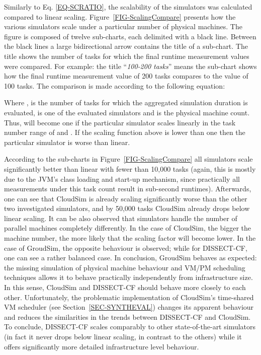 \documentclass[sort, compress, 5p]{elsarticle}
\begin{document}
Similarly to Eq. \ref{EQ-SCRATIO}, the scalability of the simulators was calculated compared to linear scaling. Figure~\ref{FIG-ScalingCompare} presents how the various simulators scale under a particular number of physical machines. The figure is composed of twelve sub-charts, each delimited with a black line. Between the black lines a large bidirectional arrow contains the title of a sub-chart. The title shows the number of tasks for which the final runtime measurement values were compared. For example: the title ``\emph{100-200 tasks}'' means the sub-chart shows how the final runtime measurement value of 200 tasks compares to the value of 100 tasks. The comparison is made according to the following equation:

Where ,  is the number of tasks for which the aggregated simulation duration is evaluated,  is one of the evaluated simulators and  is the physical machine count. Thus,  will become one if the particular simulator scales linearly in the task number range of  and . If the scaling function above is lower than one then the particular simulator is worse than linear. 

According to the sub-charts in Figure~\ref{FIG-ScalingCompare} all simulators scale significantly better than linear with fewer than 10,000 tasks (again, this is mostly due to the JVM's class loading and start-up mechanism, since practically all measurements under this task count result in sub-second runtimes). Afterwards, one can see that CloudSim is already scaling significantly worse than the other two investigated simulators, and by 50,000 tasks CloudSim already drops below linear scaling. It can be also observed that simulators handle the number of parallel machines completely differently. In the case of CloudSim, the bigger the machine number, the more likely that the scaling factor will become lower. In the case of GroudSim, the opposite behaviour is observed; while for DISSECT-CF, one can see a rather balanced case. In conclusion, GroudSim behaves as expected: the missing simulation of physical machine behaviour and VM/PM scheduling techniques allows it to behave practically independently from infrastructure size. In this sense, CloudSim and DISSECT-CF should behave more closely to each other. Unfortunately, the problematic implementation of CloudSim's time-shared VM scheduler (see Section~\ref{SEC-SYNTHEVAL}) changes its apparent behaviour and reduces the similarities in the trends between DISSECT-CF and CloudSim. To conclude, DISSECT-CF scales comparably to other state-of-the-art simulators (in fact it never drops below linear scaling, in contrast to the others) while it offers significantly more detailed infrastructure level behaviour.
\end{document}
